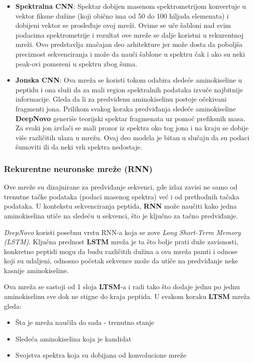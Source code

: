 \documentclass[12pt,oneside]{memoir}
\begin{document}
\begin{itemize}
\item \textbf{Spektralna CNN}: Spektar dobijen masenom spektrometrijom konvertuje u vektor fiksne dužine (koji obično ima od 50 do 100 hiljada elemenata) i dobijeni vektor se prosleđuje ovoj mreži. Ovime se uče šabloni nad svim podacima spektrometrije i rezultat ove mreže se dalje koristni u rekurentnoj mreži. Ovo predstavlja značajan deo arhitekture jer može dosta da poboljša preciznost sekvenciranja i može da nauči šablone u spektru čak i ako su neki peak-ovi pomereni u spektru zbog šuma.
\item \textbf{Jonska CNN}: Ova mreža se koristi tokom odabira sledeće aminokiseline u peptidu i ona služi da za mali region spektralnih podataka izvuče najbitnije informacije. Gleda da li za predviđenu aminokiselinu postoje očekivani fragmenti jona. Prilikom svakog koraka predviđanja sledeće aminokiseline \textbf{DeepNovo} generiše teorijski spektar fragmenata uz pomoć prefiksnih masa. Za svaki jon izvlači se mali prozor iz spektra oko tog jona i na kraju se dobije više različitih ulaza u mrežu. Ovaj deo modela je bitan u slučaju da su podaci šumoviti ili da neki vrh spektra nedostaje.
\end{itemize}

\subsubsection{Rekurentne neuronske mreže (RNN)}
Ove mreže su dizajnirane za predviđanje sekvenci, gde izlaz zavisi ne samo od trenutne tačke podataka (podaci masenog spektra) već i od prethodnih tačaka podataka. U kontekstu sekvenciranja peptida, \textbf{RNN} može naučiti kako jedna aminokiselina utiče na sledeću u sekvenci, što je ključno za tačno predviđanje.

\emph{DeepNovo} koristi posebnu vrstu RNN-a koja se zove \emph{Long Short-Term Memory (LSTM)}. Ključna prednost \textbf{LSTM} mreža je ta što bolje prati duže zavisnosti, konkretno peptidi mogu da budu različitih dužina a ova mreža pamti i odnose koji su udaljeni, odnosno početak sekvence može da utiče na predviđanje neke kasnije aminokiseline.

Ova mreža se sastoji od 1 sloja \textbf{LTSM}-a i radi tako što dodaje jednu po jednu aminokiselinu sve dok ne stigne do kraja peptida. U svakom koraku \textbf{LTSM} mreža gleda:
\begin{itemize}
    \item Šta je mreža naučila do sada - trenutno stanje
    \item Sledeća aminokiselina koja je kandidat
    \item Svojstva spektra koja su dobijana od konvolucione mreže
\end{itemize}
\end{document}
